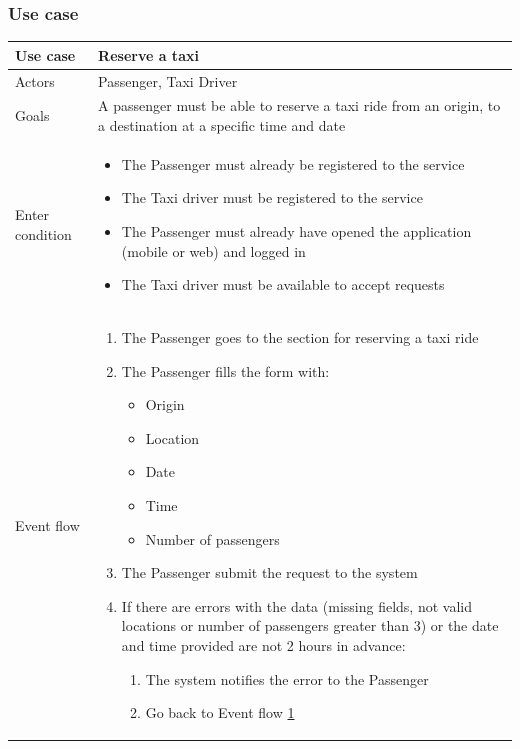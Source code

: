 \subsubsection{Use case}
\begin{center}
	\begin{longtable}{| p{} | p{} |} \hline
		Use case & \textbf{Reserve a taxi} \\ \hline 
		Actors & Passenger, Taxi Driver \\ \hline
		Goals & A passenger must be able to reserve a taxi ride from an origin, to a destination at a specific time and date \\ \hline
		Enter condition & \begin{itemize}
			\item The Passenger must already be registered to the service
			\item The Taxi driver must be registered to the service
			\item The Passenger must already have opened the application (mobile or web) and logged in
			\item The Taxi driver must be available to accept requests
		\end{itemize} \\ \hline
		Event flow & \begin{enumerate}
			\item The Passenger goes to the section for reserving a taxi ride
			\item \label{fillForm} The Passenger fills the form with:
			\begin{itemize}
				\item Origin
				\item Location
				\item Date
				\item Time
				\item Number of passengers
			\end{itemize}
			\item The Passenger submit the request to the system
			\item If there are errors with the data (missing fields, not valid locations or number of passengers greater than 3) or the date and time provided are not 2 hours in advance:
			\begin{enumerate}
				\item The system notifies the error to the Passenger
				\item Go back to Event flow \ref{fillForm}
			\end{enumerate}

\end{enumerate}
\end{longtable}
\end{center}
